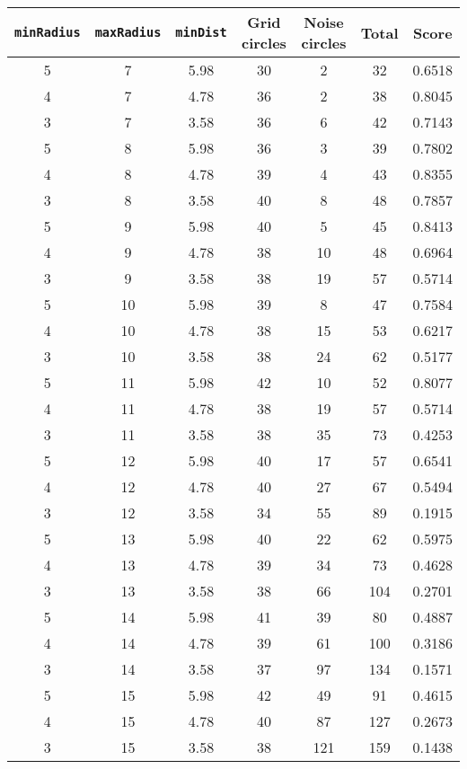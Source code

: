\documentclass[letterpaper, 12pt]{article}
\begin{document}
\begin{longtable}{|c|c|c|c|c|c|c|}
\hline
\textbf{\texttt{minRadius}} & \textbf{\texttt{maxRadius}} & \textbf{\texttt{minDist}} & \textbf{Grid circles} & \textbf{Noise circles} & \textbf{Total} & \textbf{Score} \\
\hline
5 & 7 & 5.98 & 30 & 2 & 32 & 0.6518 \\
\hline
4 & 7 & 4.78 & 36 & 2 & 38 & 0.8045 \\
\hline
3 & 7 & 3.58 & 36 & 6 & 42 & 0.7143 \\
\hline
5 & 8 & 5.98 & 36 & 3 & 39 & 0.7802 \\
\hline
4 & 8 & 4.78 & 39 & 4 & 43 & 0.8355 \\
\hline
3 & 8 & 3.58 & 40 & 8 & 48 & 0.7857 \\
\hline
5 & 9 & 5.98 & 40 & 5 & 45 & 0.8413 \\
\hline
4 & 9 & 4.78 & 38 & 10 & 48 & 0.6964 \\
\hline
3 & 9 & 3.58 & 38 & 19 & 57 & 0.5714 \\
\hline
5 & 10 & 5.98 & 39 & 8 & 47 & 0.7584 \\
\hline
4 & 10 & 4.78 & 38 & 15 & 53 & 0.6217 \\
\hline
3 & 10 & 3.58 & 38 & 24 & 62 & 0.5177 \\
\hline
5 & 11 & 5.98 & 42 & 10 & 52 & 0.8077 \\
\hline
4 & 11 & 4.78 & 38 & 19 & 57 & 0.5714 \\
\hline
3 & 11 & 3.58 & 38 & 35 & 73 & 0.4253 \\
\hline
5 & 12 & 5.98 & 40 & 17 & 57 & 0.6541 \\
\hline
4 & 12 & 4.78 & 40 & 27 & 67 & 0.5494 \\
\hline
3 & 12 & 3.58 & 34 & 55 & 89 & 0.1915 \\
\hline
5 & 13 & 5.98 & 40 & 22 & 62 & 0.5975 \\
\hline
4 & 13 & 4.78 & 39 & 34 & 73 & 0.4628 \\
\hline
3 & 13 & 3.58 & 38 & 66 & 104 & 0.2701 \\
\hline
5 & 14 & 5.98 & 41 & 39 & 80 & 0.4887 \\
\hline
4 & 14 & 4.78 & 39 & 61 & 100 & 0.3186 \\
\hline
3 & 14 & 3.58 & 37 & 97 & 134 & 0.1571 \\
\hline
5 & 15 & 5.98 & 42 & 49 & 91 & 0.4615 \\
\hline
4 & 15 & 4.78 & 40 & 87 & 127 & 0.2673 \\
\hline
3 & 15 & 3.58 & 38 & 121 & 159 & 0.1438 \\

\end{longtable}
\end{document}
